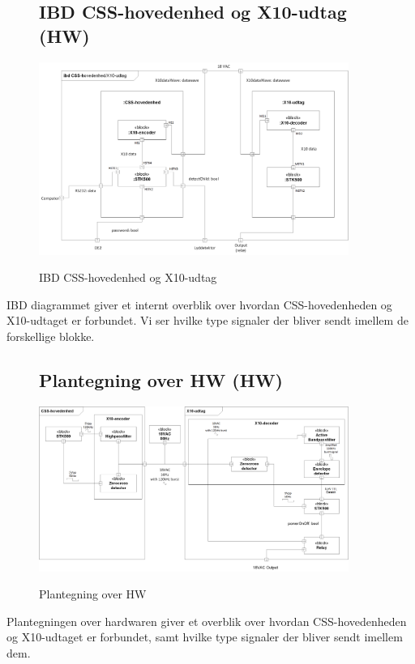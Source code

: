 \begin{figure}[H] \centering
\subsection{IBD CSS-hovedenhed og X10-udtag (HW)}
{\includegraphics[width=0.9\textwidth]{billeder/diagrammer/IBD_Hovedenhed_Modtager}}
\caption{IBD CSS-hovedenhed og X10-udtag}
\label{lab:ibdhovedenhedmodtager}
\raggedright
\end{figure}
IBD diagrammet giver et internt overblik over hvordan CSS-hovedenheden og X10-udtaget er forbundet. Vi ser hvilke type signaler der bliver sendt imellem de forskellige blokke.

\begin{figure}[H] \centering
\subsection{Plantegning over HW (HW)}
{\includegraphics[width=0.9\textwidth]{billeder/diagrammer/Plantegning_over_HW}}
\caption{Plantegning over HW}
\label{lab:Plantegning over HW}
\raggedright
\end{figure}
Plantegningen over hardwaren giver et overblik over hvordan CSS-hovedenheden og X10-udtaget er forbundet, samt hvilke type signaler der bliver sendt imellem dem.

